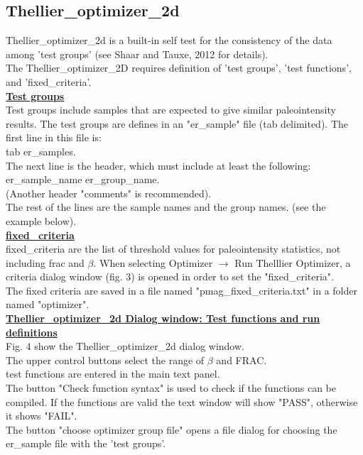 \documentclass[12pt]{article}
\begin{document}
\subsection{Thellier\_optimizer\_2d}
Thellier\_optimizer\_2d is a built-in self test for the consistency of the data among 'test groups' (see Shaar and Tauxe, 2012 for details).\\
The Thellier\_optimizer\_2D requires definition of 'test groups',  'test functions', and 'fixed\_criteria'.\\
 \underline{ \textbf{ Test groups }}\\
Test groups include samples that are expected to give  similar paleointensity results. The test groups are defines in an "er\_sample" file (tab delimited). The first line in this file is:\\
tab 	er\_samples.\\
The next line is the header, which must include at least the following:\\
er\_sample\_name	 er\_group\_name.\\
(Another header "comments" is recommended).\\
The rest of the lines are the sample names and the group names. (see the example below). \\
 \underline{ \textbf{ fixed\_criteria }}\\
fixed\_criteria are the list of threshold values  for paleointensity statistics, not including frac and $\beta$. When selecting Optimizer $\rightarrow$ Run Thelllier Optimizer, a criteria dialog window (fig. 3) is opened in order to set the "fixed\_criteria".\\ The fixed criteria are saved in a file named "pmag\_fixed\_criteria.txt" in a folder named "optimizer".\\
 \underline{ \textbf{ Thellier\_optimizer\_2d Dialog window: Test functions and run definitions }}\\
 Fig. 4 show the  Thellier\_optimizer\_2d dialog window. \\
The upper control buttons select the range of $\beta$ and  FRAC.\\
test functions are entered in the main text panel.\\
The button "Check function syntax" is used to check if the functions can be compiled. If the functions are valid the text window will show "PASS", otherwise it shows "FAIL". \\
The button "choose optimizer group file" opens a file dialog for choosing the er\_sample file with the 'test groups'.\\
\end{document}
